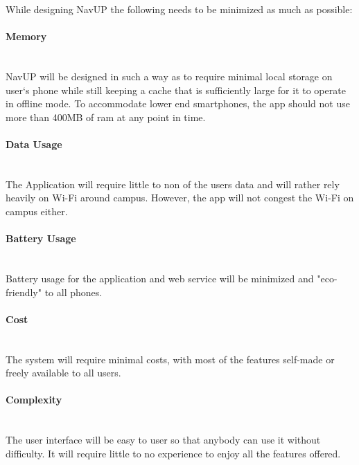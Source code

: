 While designing NavUP the following needs to be minimized as much as possible:


\paragraph{Memory}
\mbox{}\\
NavUP will be designed in such a way as to require minimal local storage on user`s phone while still keeping a cache that is sufficiently large for it to operate in offline mode. To accommodate lower end smartphones, the app should not use more than 400MB of ram at any point in time.

\paragraph{Data Usage}
\mbox{}\\
The Application will require little to non of the users data and will rather rely heavily on Wi-Fi around campus. However, the app will not congest the Wi-Fi on campus either.

\paragraph{Battery Usage}
\mbox{}\\
Battery usage for the application and web service will be minimized and "eco-friendly" to all phones.

\paragraph{Cost}
\mbox{}\\
The system will require minimal costs, with most of the features self-made or freely available to all users.

\paragraph{Complexity}
\mbox{}\\
The user interface will be easy to user so that anybody can use it without difficulty. 
It will require little to no experience to enjoy all the features offered.
